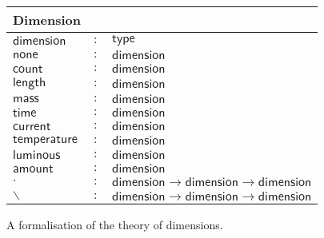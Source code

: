 \begin{figure}[h]
  \begin{center}
    \begin{tabular}{|l c l|}
      \hline
      \textsf{Dimension} & &\\\hline
      $\mathsf{dimension}$ & $:$ & $ \mathsf{type}$\\

      $\mathsf{none}$ & $:$ & $ \mathsf{dimension}$\\
      $\mathsf{count}$ & $:$ & $ \mathsf{dimension}$\\
      $\mathsf{length}$ & $:$ & $ \mathsf{dimension}$\\
      $\mathsf{mass}$ & $:$ & $ \mathsf{dimension}$\\
      $\mathsf{time}$ & $:$ & $ \mathsf{dimension}$\\
      $\mathsf{current}$ & $:$ & $ \mathsf{dimension}$\\
      $\mathsf{temperature}$ & $:$ & $ \mathsf{dimension}$\\
      $\mathsf{luminous}$ & $:$ & $ \mathsf{dimension}$\\
      $\mathsf{amount}$ & $:$ & $ \mathsf{dimension}$\\

      $\cdot{}$ & $:$ & $ \mathsf{dimension} \rightarrow \mathsf{dimension} \rightarrow \mathsf{dimension}$\\
      $\backslash$ & $:$ & $ \mathsf{dimension} \rightarrow \mathsf{dimension} \rightarrow \mathsf{dimension}$\\\hline
    \end{tabular}
  \end{center}
  \caption{A formalisation of the theory of dimensions. }
  \label{fig:dimensions}
\end{figure}
